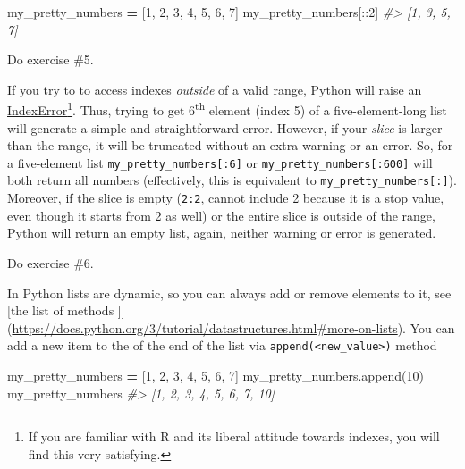 \documentclass[
]{book}
\newenvironment{Shaded}{\begin{snugshade}}{\end{snugshade}}
\newcommand{\CommentTok}[1]{\textcolor[rgb]{0.56,0.35,0.01}{\textit{#1}}}
\newcommand{\DecValTok}[1]{\textcolor[rgb]{0.00,0.00,0.81}{#1}}
\newcommand{\NormalTok}[1]{#1}
\newcommand{\OperatorTok}[1]{\textcolor[rgb]{0.81,0.36,0.00}{\textbf{#1}}}
\begin{document}
\begin{Shaded}
\begin{Highlighting}[]
\NormalTok{my\_pretty\_numbers }\OperatorTok{=}\NormalTok{ [}\DecValTok{1}\NormalTok{, }\DecValTok{2}\NormalTok{, }\DecValTok{3}\NormalTok{, }\DecValTok{4}\NormalTok{, }\DecValTok{5}\NormalTok{, }\DecValTok{6}\NormalTok{, }\DecValTok{7}\NormalTok{]}
\NormalTok{my\_pretty\_numbers[::}\DecValTok{2}\NormalTok{]}
\CommentTok{\#\textgreater{} [1, 3, 5, 7]}
\end{Highlighting}
\end{Shaded}

Do exercise \#5.

If you try to to access indexes \emph{outside} of a valid range, Python will raise an \href{https://docs.python.org/3/library/exceptions.html\#IndexError}{IndexError}\footnote{If you are familiar with R and its liberal attitude towards indexes, you will find this very satisfying.}. Thus, trying to get 6\textsuperscript{th} element (index 5) of a five-element-long list will generate a simple and straightforward error. However, if your \emph{slice} is larger than the range, it will be truncated without an extra warning or an error. So, for a five-element list \texttt{my\_pretty\_numbers{[}:6{]}} or \texttt{my\_pretty\_numbers{[}:600{]}} will both return all numbers (effectively, this is equivalent to \texttt{my\_pretty\_numbers{[}:{]}}). Moreover, if the slice is empty (\texttt{2:2}, cannot include 2 because it is a stop value, even though it starts from 2 as well) or the entire slice is outside of the range, Python will return an empty list, again, neither warning or error is generated.

Do exercise \#6.

In Python lists are dynamic, so you can always add or remove elements to it, see {[}the list of methods {]}{]}(\url{https://docs.python.org/3/tutorial/datastructures.html\#more-on-lists}). You can add a new item to the of the end of the list via \texttt{append(\textless{}new\_value\textgreater{})} method

\begin{Shaded}
\begin{Highlighting}[]
\NormalTok{my\_pretty\_numbers }\OperatorTok{=}\NormalTok{ [}\DecValTok{1}\NormalTok{, }\DecValTok{2}\NormalTok{, }\DecValTok{3}\NormalTok{, }\DecValTok{4}\NormalTok{, }\DecValTok{5}\NormalTok{, }\DecValTok{6}\NormalTok{, }\DecValTok{7}\NormalTok{]}
\NormalTok{my\_pretty\_numbers.append(}\DecValTok{10}\NormalTok{)}
\NormalTok{my\_pretty\_numbers}
\CommentTok{\#\textgreater{} [1, 2, 3, 4, 5, 6, 7, 10]}
\end{Highlighting}
\end{Shaded}
\end{document}

